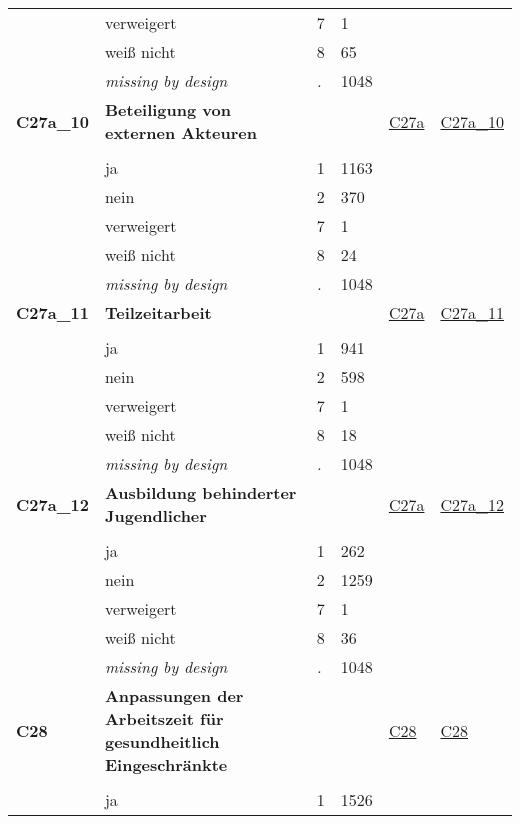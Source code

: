 \begin{longtable}{| L{2.45cm} | L{6cm} | C{1.5cm} | R{1cm} | C{2.25cm} | C{2.25cm} |}
   & verweigert & 7 & 1 &  &  \\ 
   & weiß nicht & 8 & 65 &  &  \\ 
   & \textit{missing by design} & \textit{.} & 1048 &  &  \\ 
   \midrule
\textbf{C27a\_10}\label{var:C27a:10} & \textbf{Beteiligung von externen Akteuren} &  &  & \hyperref[C27a]{C27a} & \hyperref[var:suf:C27a:10]{C27a\_10} \\ 
   &  &  &  &  &  \\ 
   & ja & 1 & 1163 &  &  \\ 
   & nein & 2 & 370 &  &  \\ 
   & verweigert & 7 & 1 &  &  \\ 
   & weiß nicht & 8 & 24 &  &  \\ 
   & \textit{missing by design} & \textit{.} & 1048 &  &  \\ 
   \midrule
\textbf{C27a\_11}\label{var:C27a:11} & \textbf{Teilzeitarbeit} &  &  & \hyperref[C27a]{C27a} & \hyperref[var:suf:C27a:11]{C27a\_11} \\ 
   &  &  &  &  &  \\ 
   & ja & 1 & 941 &  &  \\ 
   & nein & 2 & 598 &  &  \\ 
   & verweigert & 7 & 1 &  &  \\ 
   & weiß nicht & 8 & 18 &  &  \\ 
   & \textit{missing by design} & \textit{.} & 1048 &  &  \\ 
   \midrule
\textbf{C27a\_12}\label{var:C27a:12} & \textbf{Ausbildung behinderter Jugendlicher} &  &  & \hyperref[C27a]{C27a} & \hyperref[var:suf:C27a:12]{C27a\_12} \\ 
   &  &  &  &  &  \\ 
   & ja & 1 & 262 &  &  \\ 
   & nein & 2 & 1259 &  &  \\ 
   & verweigert & 7 & 1 &  &  \\ 
   & weiß nicht & 8 & 36 &  &  \\ 
   & \textit{missing by design} & \textit{.} & 1048 &  &  \\ 
   \midrule
\textbf{C28}\label{var:C28} & \textbf{Anpassungen der Arbeitszeit für gesundheitlich Eingeschränkte} &  &  & \hyperref[C28]{C28} & \hyperref[var:suf:C28]{C28} \\ 
   &  &  &  &  &  \\ 
   & ja & 1 & 1526 &  &  \\ 

\end{longtable}
